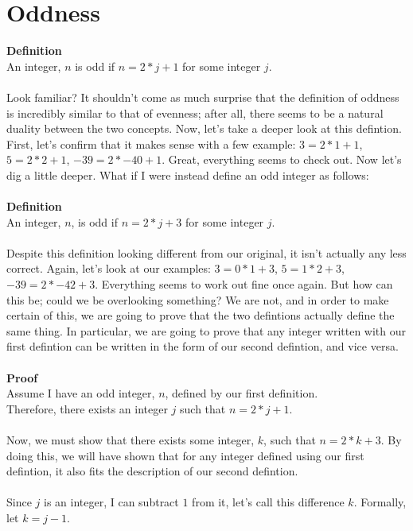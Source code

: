\documentclass[a4paper,12pt]{article}
\begin{document}
\section{Oddness}
\textbf{Definition}\\
An integer, $n$ is odd if $n = 2*j + 1$ for some integer $j$.\\
\\
Look familiar? It shouldn't come as much surprise that the definition of oddness is incredibly similar to that of evenness; after all, there seems to be a natural duality between the two concepts. Now, let's take a deeper look at this defintion. First, let's confirm that it makes sense with a few example: $3 = 2*1 + 1$, $5 = 2*2 + 1$, $-39 = 2*-40 + 1$. Great, everything seems to check out. Now let's dig a little deeper. What if I were instead define an odd integer as follows:\\
\\
\textbf{Definition}\\
An integer, $n$, is odd if $n = 2*j + 3$ for some integer $j$.\\
\\
Despite this definition looking different from our original, it isn't actually any less correct. Again, let's look at our examples: $3 = 0*1 + 3$, $5 = 1*2 + 3$, $-39 = 2*-42 + 3$. Everything seems to work out fine once again. But how can this be; could we be overlooking something? We are not, and in order to make certain of this, we are going to prove that the two defintions actually define the same thing. In particular, we are going to prove that any integer written with our first defintion can be written in the form of our second defintion, and vice versa.\\
\\
\textbf{Proof}\\
Assume I have an odd integer, $n$, defined by our first definition.\\
Therefore, there exists an integer $j$ such that $n = 2*j + 1$.\\
\\
Now, we must show that there exists some integer, $k$, such that $n = 2*k + 3$. By doing this, we will have shown that for any integer defined using our first defintion, it also fits the description of our second defintion.\\
\\
Since $j$ is an integer, I can subtract $1$ from it, let's call this difference $k$. Formally, let $k = j - 1$.\\
\\
\end{document}
